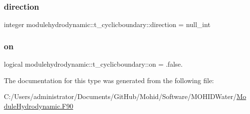 \subsubsection{\texorpdfstring{direction}{direction}}
{\footnotesize\ttfamily integer modulehydrodynamic\+::t\+\_\+cyclicboundary\+::direction = null\+\_\+int\hspace{0.3cm}{\ttfamily [private]}}

\mbox{\label{structmodulehydrodynamic_1_1t__cyclicboundary_a92406306fb56d8addb88bf790e431497}} 
\subsubsection{\texorpdfstring{on}{on}}
{\footnotesize\ttfamily logical modulehydrodynamic\+::t\+\_\+cyclicboundary\+::on = .false.\hspace{0.3cm}{\ttfamily [private]}}



The documentation for this type was generated from the following file\+:\begin{DoxyCompactItemize}
\item 
C\+:/\+Users/administrator/\+Documents/\+Git\+Hub/\+Mohid/\+Software/\+M\+O\+H\+I\+D\+Water/\mbox{\hyperlink{_module_hydrodynamic_8_f90}{Module\+Hydrodynamic.\+F90}}\end{DoxyCompactItemize}
